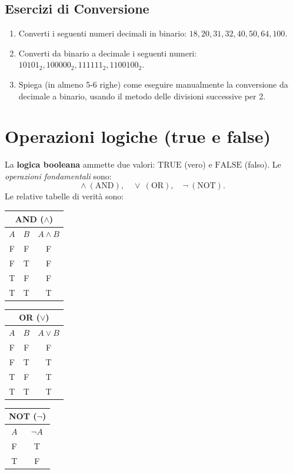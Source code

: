 \documentclass[a4paper,12pt]{report}
\begin{document}
\subsection*{Esercizi di Conversione}
\begin{enumerate}
    \item Converti i seguenti numeri decimali in binario: \(18, 20, 31, 32, 40, 50, 64, 100\).
    \item Converti da binario a decimale i seguenti numeri: \(10101_2, 100000_2, 111111_2, 1100100_2\).
    \item Spiega (in almeno 5-6 righe) come eseguire manualmente la conversione da decimale a binario, usando il metodo delle divisioni successive per 2.
\end{enumerate}

\newpage
\section{Operazioni logiche (true e false)}\label{sec:logiche}
La \textbf{logica booleana} ammette due valori: \(\text{TRUE}\) (vero) e \(\text{FALSE}\) (falso). Le \emph{operazioni fondamentali} sono:
\[
\land \ (\text{AND}),\quad
\lor \ (\text{OR}),\quad
\lnot \ (\text{NOT}).
\]
Le relative tabelle di verità sono:

\begin{center}
\renewcommand{\arraystretch}{1.2}
\begin{tabular}{c|c|c}
\multicolumn{3}{c}{\textbf{AND} (\(\land\))}\\
\hline
\(A\) & \(B\) & \(A \land B\) \\
\hline
F & F & F \\
F & T & F \\
T & F & F \\
T & T & T \\
\end{tabular}
\quad
\begin{tabular}{c|c|c}
\multicolumn{3}{c}{\textbf{OR} (\(\lor\))}\\
\hline
\(A\) & \(B\) & \(A \lor B\) \\
\hline
F & F & F \\
F & T & T \\
T & F & T \\
T & T & T \\
\end{tabular}
\quad
\begin{tabular}{c|c}
\multicolumn{2}{c}{\textbf{NOT} (\(\lnot\))}\\
\hline
\(A\) & \(\lnot A\) \\
\hline
F & T \\
T & F \\
\end{tabular}
\end{center}
\end{document}

